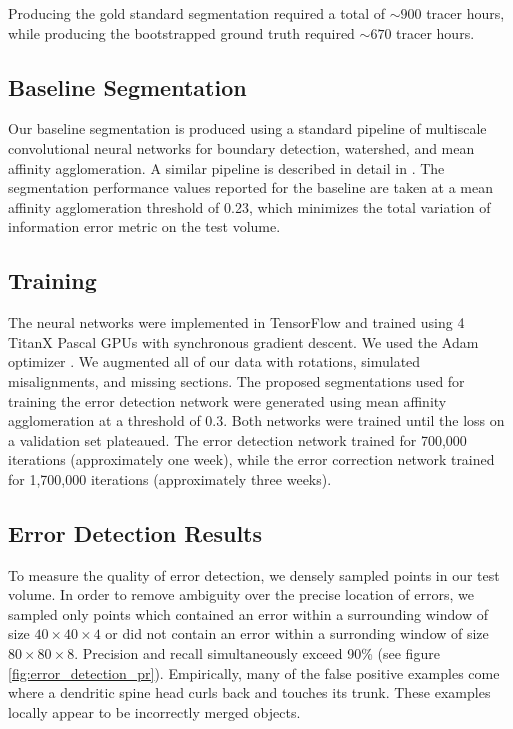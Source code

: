 \documentclass{article}
\begin{document}
Producing the gold standard segmentation required a total of $\sim900$ tracer hours, while producing the bootstrapped ground truth required $\sim 670$ tracer hours.

\subsection{Baseline Segmentation}
Our baseline segmentation is produced using a standard pipeline of multiscale convolutional neural networks for boundary detection, watershed, and mean affinity agglomeration. A similar pipeline is described in detail in  \cite{kisuk}. The segmentation performance values reported for the baseline are taken at a mean affinity agglomeration threshold of 0.23, which minimizes the total variation of information error metric on the test volume.

\subsection{Training}
The neural networks were implemented in TensorFlow \cite{tensorflow} and trained using 4 TitanX Pascal GPUs with synchronous gradient descent. We used the Adam optimizer \cite{adam}. We augmented all of our data with rotations, simulated misalignments, and missing sections. The proposed segmentations used for training the error detection network were generated using mean affinity agglomeration at a threshold of 0.3. Both networks were trained until the loss on a validation set plateaued. The error detection network trained for 700,000 iterations (approximately one week), while the error correction network trained for 1,700,000 iterations (approximately three weeks).

\subsection{Error Detection Results}
To measure the quality of error detection, we densely sampled points in our test volume. In order to remove ambiguity over the precise location of errors, we sampled only points which contained an error within a surrounding window of size $40\times 40 \times 4$ or did not contain an error within a surronding window of size $80 \times 80 \times 8$. Precision and recall simultaneously exceed 90\% (see figure \ref{fig:error_detection_pr}). Empirically, many of the false positive examples come where a dendritic spine head curls back and touches its trunk. These examples locally appear to be incorrectly merged objects.
\end{document}

